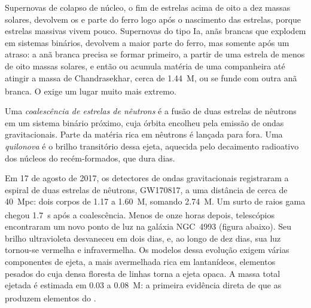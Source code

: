 Supernovas de colapso de núcleo, o fim de estrelas acima de oito a dez
massas solares, devolvem os  e parte do ferro logo após o
nascimento das estrelas, porque estrelas massivas vivem pouco. Supernovas do tipo Ia,
anãs brancas que explodem em sistemas binários, devolvem a maior parte do
ferro, mas somente após um atraso: a anã branca precisa se formar primeiro, a partir de
uma estrela de menos de oito massas solares, e então ou acumula matéria de uma
companheira até atingir a massa de Chandrasekhar, cerca de
\qty{1.44}{M_\odot}, ou se funde com outra anã branca. O  exige um
lugar muito mais extremo.

\begin{definition}\label{def:b3:origin-of-elements:kilonova}
Uma \emph{coalescência de estrelas de nêutrons} é a
fusão de duas estrelas de nêutrons em um sistema binário próximo, cuja órbita encolheu
pela emissão de ondas gravitacionais. Parte da matéria rica em nêutrons é
lançada para fora. Uma \emph{quilonova} é o brilho transitório
dessa ejeta, aquecida pelo decaimento radioativo dos núcleos do  recém-formados,
que dura dias.
\end{definition}

Em 17 de agosto de 2017, os detectores de ondas gravitacionais registraram a
espiral de duas estrelas de nêutrons, GW170817, a uma distância de cerca de
\qty{40}{Mpc}: dois corpos de \num{1.17} a \qty{1.60}{M_\odot}, somando
\qty{2.74}{M_\odot}. Um surto de raios gama chegou \qty{1.7}{s} após a
coalescência. Menos de onze horas depois, telescópios encontraram um novo ponto de
luz na galáxia NGC~4993 (figura abaixo). Seu brilho ultravioleta desvaneceu em
dois dias, e, ao longo de dez dias, sua luz tornou-se vermelha e infravermelha.
Os modelos dessa evolução exigem várias componentes de ejeta, a mais avermelhada
rica em lantanídeos, elementos pesados do  cuja densa floresta de linhas
torna a ejeta opaca. A massa total ejetada é estimada em
\num{0.03} a \qty{0.08}{M_\odot}: a primeira evidência direta de que
as  produzem elementos do .

